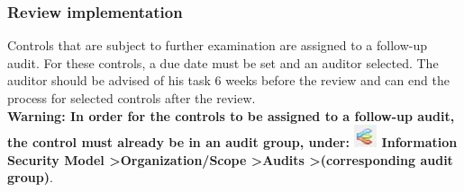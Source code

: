 \documentclass[a4paper,10pt]{book}
\begin{document}
\subsubsection{Review implementation}
Controls that are subject to further examination are assigned to a follow-up audit. For these controls, a due date must be set and an auditor selected. The auditor should be advised of his task 6 weeks before the review and can end the process for selected controls after the review.
\newline\\
\textbf{Warning: In order for the controls to be assigned to a follow-up audit, the control must already be in an audit group,
under: \textbf {\includegraphics[height=2ex]{Icon/Informationssicherheitsmodell.png} Information Security Model \textgreater Organization/Scope \textgreater Audits
\textgreater (corresponding audit group)}}.
\end{document}
